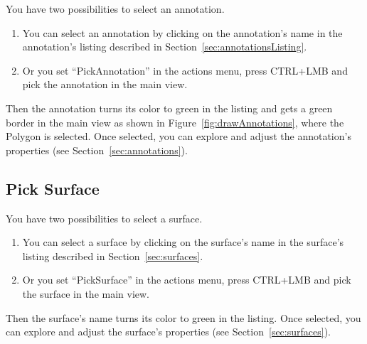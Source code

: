 You have two possibilities to select an annotation.
\begin{enumerate}
	\item You can select an annotation by clicking on the annotation's name in the annotation's listing described in Section~\ref{sec:annotationsListing}.
	\item Or you set ``PickAnnotation'' in the actions menu, press CTRL+LMB and pick the annotation in the main view.
\end{enumerate}
Then the annotation turns its color to green in the listing and gets a green border in the main view as shown in Figure~\ref{fig:drawAnnotations}, where the Polygon is selected. Once selected, you can explore and adjust the annotation's properties (see Section~\ref{sec:annotations}).
\subsection{Pick Surface}
\label{sec:pickSurface}

You have two possibilities to select a surface.
\begin{enumerate}
	\item You can select a surface by clicking on the surface's name in the surface's listing described in Section~\ref{sec:surfaces}.
	\item Or you set ``PickSurface'' in the actions menu, press CTRL+LMB and pick the surface in the main view.
\end{enumerate}
Then the surface's name turns its color to green in the listing. Once selected, you can explore and adjust the surface's properties (see Section~\ref{sec:surfaces}).




